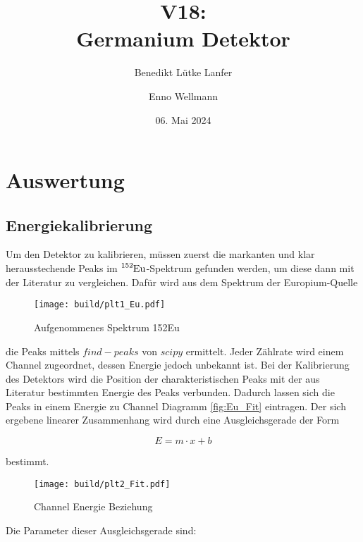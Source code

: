 

\title{V18:\\ Germanium Detektor}
\author{Benedikt Lütke Lanfer \and Enno Wellmann}
\date{06. Mai 2024}
\publishers{TU Dortmund – Fakultät Physik}



\tableofcontents
\newpage



\newpage
\section{Auswertung}
\subsection{Energiekalibrierung}
Um den Detektor zu kalibrieren, müssen zuerst die markanten und klar herausstechende Peaks im $\ce{^{152}Eu}$-Spektrum gefunden
werden, um diese dann mit der Literatur zu vergleichen. Dafür wird aus dem
Spektrum der Europium-Quelle

\begin{figure}[H]
	\centering
	\texttt{[image: build/plt1\_Eu.pdf]}
	\caption{Aufgenommenes Spektrum 152Eu}\label{fig:Eu_spektrum}
	\FloatBarrier
\end{figure}

die Peaks mittels $find-peaks$ von $scipy$ \cite{scipy} ermittelt. Jeder
Zählrate wird einem Channel zugeordnet, dessen Energie jedoch unbekannt ist.
Bei der Kalibrierung des Detektors wird die Position der charakteristischen
Peaks mit der aus Literatur \cite{web:Eu} bestimmten Energie des Peaks
verbunden. Dadurch lassen sich die Peaks in einem Energie zu Channel Diagramm
\eqref{fig:Eu_Fit} eintragen. Der sich ergebene linearer Zusammenhang wird
durch eine Ausgleichsgerade der Form

\begin{equation}
	E=m \cdot x +b
\end{equation}

bestimmt.

\begin{figure}[H]
	\centering
	\texttt{[image: build/plt2\_Fit.pdf]}
	\caption{Channel Energie Beziehung}\label{fig:Eu_Fit}
\end{figure}

Die Parameter dieser Ausgleichsgerade sind:

